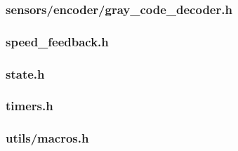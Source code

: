 \newpage
\subsubsection{sensors/encoder/gray\_code\_decoder.h}
\label{module_sensors_encoder_gray_code_decoder}




\newpage
\subsubsection{speed\_feedback.h}
\label{module_speed_feedback}



\newpage
\subsubsection{state.h}
\label{module_state}



\newpage
\subsubsection{timers.h}
\label{module_timers}



\newpage
\subsubsection{utils/macros.h}
\label{module_macros}


